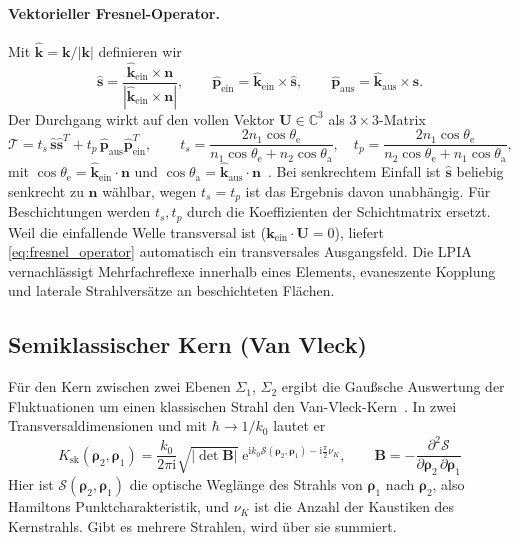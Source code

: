 \documentclass[11pt,a4paper]{scrartcl}
\theoremstyle{insightstyle}
\newcommand{\ii}{\mathrm{i}}
\newcommand{\ee}{\mathrm{e}}
\newcommand{\rh}{\bm{\rho}}
\newcommand{\Sc}{\mathcal{S}}
\begin{document}
\paragraph{Vektorieller Fresnel-Operator.} Mit $\hat{\bm k}=\bm k/|\bm k|$ definieren wir
\begin{equation}
    \hat{\bm s} = \frac{\hat{\bm k}_\text{ein}\times\bm n}{|\hat{\bm k}_\text{ein}\times\bm n|},\qquad
    \hat{\bm p}_\text{ein} = \hat{\bm k}_\text{ein}\times\hat{\bm s},\qquad
    \hat{\bm p}_\text{aus} = \hat{\bm k}_\text{aus}\times\hat{\bm s}.
\end{equation}
Der Durchgang wirkt auf den vollen Vektor $\bm U\in\mathbb C^3$ als $3\times3$-Matrix
\begin{equation}
    \bm{\mathcal T} = t_s\,\hat{\bm s}\hat{\bm s}^T + t_p\,\hat{\bm p}_\text{aus}\hat{\bm p}_\text{ein}^T,
    \qquad
    t_s=\frac{2n_1\cos\theta_\text{e}}{n_1\cos\theta_\text{e}+n_2\cos\theta_\text{a}},\quad
    t_p=\frac{2n_1\cos\theta_\text{e}}{n_2\cos\theta_\text{e}+n_1\cos\theta_\text{a}},
    \label{eq:fresnel_operator}
\end{equation}
mit $\cos\theta_\text{e}=\hat{\bm k}_\text{ein}\cdot\bm n$ und $\cos\theta_\text{a}=\hat{\bm k}_\text{aus}\cdot\bm n$~\cite{bornwolf1999}. Bei senkrechtem Einfall ist $\hat{\bm s}$ beliebig senkrecht zu $\bm n$ wählbar, wegen $t_s=t_p$ ist das Ergebnis davon unabhängig. Für Beschichtungen werden $t_s,t_p$ durch die Koeffizienten der Schichtmatrix ersetzt. Weil die einfallende Welle transversal ist ($\bm k_\text{ein}\cdot\bm U=0$), liefert \eqref{eq:fresnel_operator} automatisch ein transversales Ausgangsfeld. Die LPIA vernachlässigt Mehrfachreflexe innerhalb eines Elements, evaneszente Kopplung und laterale Strahlversätze an beschichteten Flächen.

\subsection{Semiklassischer Kern (Van Vleck)}
Für den Kern zwischen zwei Ebenen $\Sigma_1$, $\Sigma_2$ ergibt die Gaußsche Auswertung der Fluktuationen um einen klassischen Strahl den Van-Vleck-Kern~\cite{vanvleck1928,morette1951}. In zwei Transversaldimensionen und mit $\hbar\to1/k_0$ lautet er
\begin{equation}
    \boxed{\;K_\text{sk}(\rh_2,\rh_1) = \frac{k_0}{2\pi\ii}\sqrt{|\det\bm B|}\;\ee^{\ii k_0\Sc(\rh_2,\rh_1)-\ii\frac\pi2\nu_K},
    \qquad \bm B = -\frac{\partial^2\Sc}{\partial\rh_2\,\partial\rh_1}\;}
    \label{eq:van_vleck}
\end{equation}
Hier ist $\Sc(\rh_2,\rh_1)$ die optische Weglänge des Strahls von $\rh_1$ nach $\rh_2$, also Hamiltons Punktcharakteristik, und $\nu_K$ ist die Anzahl der Kaustiken des Kernstrahls. Gibt es mehrere Strahlen, wird über sie summiert.
\end{document}
